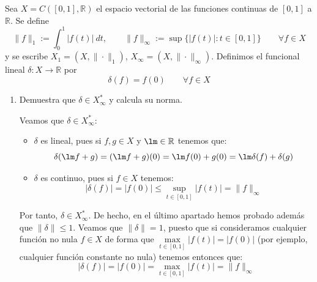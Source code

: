 \documentclass[12pt]{article}
\begin{document}
    \begin{ejercicio}[2 puntos]
        Sea $X = C([0,1],\mathbb{R})$ el espacio vectorial de las funciones continuas de $[0,1]$ a $\mathbb{R}$. Se define
        \begin{equation*}
            \|f\|_1 := \int_{0}^{1} |f(t)|~dt , \qquad \|f\|_\infty := \sup\{|f(t)| : t\in [0,1]\}\qquad \forall f\in X
        \end{equation*}
        y se escribe $X_1 = (X,\|\cdot \|_1)$, $X_{\infty} = (X,\|\cdot \|_\infty)$. Definimos el funcional lineal $\delta:X\to \mathbb{R}$ por
        \begin{equation*}
            \delta(f) = f(0) \qquad \forall f\in X
        \end{equation*}
        \begin{enumerate}[label=\alph*)]
            \item Demuestra que $\delta\in X_\infty^\ast$ y calcula su norma.

                Veamos que $\delta\in X_\infty^\ast$:
                \begin{itemize}
                    \item $\delta$ es lineal, pues si $f,g\in X$ y $\lm\in \mathbb{R}$ tenemos que:
                        \begin{equation*}
                            \delta(\lm f + g) = (\lm f + g)(0) = \lm f(0) + g(0) = \lm\delta(f) + \delta(g)
                        \end{equation*}
                    \item $\delta$ es continuo, pues si $f\in X$ tenemos:
                        \begin{equation*}
                            |\delta(f)| = |f(0)| \leq \sup_{t\in [0,1]}|f(t)| = \|f\|_\infty
                        \end{equation*}
                \end{itemize}
                Por tanto, $\delta\in X_\infty^\ast$. De hecho, en el último apartado hemos probado además que $\|\delta\|\leq 1$. Veamos que $\|\delta\| = 1$, puesto que si consideramos cualquier función no nula $f\in X$ de forma que $\max\limits_{t\in [0,1]}|f(t)| = |f(0)|$ (por ejemplo, cualquier función constante no nula) tenemos entonces que:
                \begin{equation*}
                    |\delta(f)| = |f(0)| = \max_{t\in [0,1]}|f(t)| = \|f\|_\infty
                \end{equation*}


\end{enumerate}
\end{ejercicio}
\end{document}
